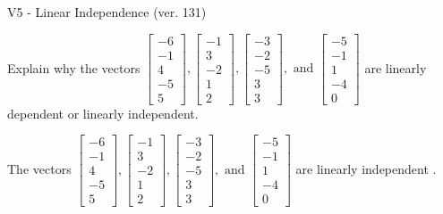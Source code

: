 \begin{exercise}
  \begin{exerciseTitle}V5 - Linear Independence (ver. 131)\end{exerciseTitle}
  \begin{exerciseStatement}
    Explain why the vectors \(\left[\begin{array}{r}
-6 \\
-1 \\
4 \\
-5 \\
5
\end{array}\right] , \left[\begin{array}{r}
-1 \\
3 \\
-2 \\
1 \\
2
\end{array}\right] , \left[\begin{array}{r}
-3 \\
-2 \\
-5 \\
3 \\
3
\end{array}\right] , \text{ and } \left[\begin{array}{r}
-5 \\
-1 \\
1 \\
-4 \\
0
\end{array}\right]\) are linearly dependent or linearly independent.	


  \end{exerciseStatement}
  \begin{exerciseAnswer}
   The vectors \(\left[\begin{array}{r}
-6 \\
-1 \\
4 \\
-5 \\
5
\end{array}\right] , \left[\begin{array}{r}
-1 \\
3 \\
-2 \\
1 \\
2
\end{array}\right] , \left[\begin{array}{r}
-3 \\
-2 \\
-5 \\
3 \\
3
\end{array}\right] , \text{ and } \left[\begin{array}{r}
-5 \\
-1 \\
1 \\
-4 \\
0
\end{array}\right]\) are 
  	 linearly independent  .
  


  \end{exerciseAnswer}
\end{exercise}